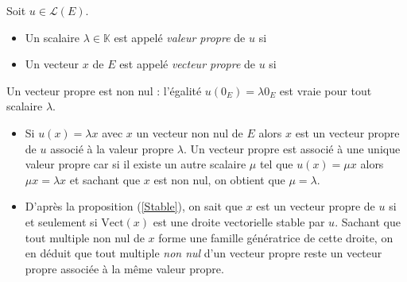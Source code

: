 \documentclass[french,11pt,twoside]{VcCours}
\begin{document}
\begin{Definition}{} Soit $u \in \mathcal{L}(E)$.

\begin{itemize}
\item Un scalaire $\lambda \in \mathbb{K}$ est appelé \emph{valeur propre} de $u$ si \newline {}
\item Un vecteur $x$ de $E$ est appelé \emph{vecteur propre} de $u$ si \newline {}
\end{itemize}
\end{Definition}


\begin{Remarque}[\alerte]{} Un vecteur propre est non nul : l'égalité $u(0_E) = \lambda 0_E$ est vraie pour tout scalaire $\lambda$.
\end{Remarque}


\begin{Remarques}{}
\begin{itemize} 
\item Si $u(x) = \lambda x$ avec $x$ un vecteur non nul de $E$ alors $x$ est un vecteur propre de $u$ associé à la valeur propre $\lambda$. Un vecteur propre est associé à une unique valeur propre car si il existe un autre scalaire $\mu$ tel que $u(x)= \mu x$ alors $\mu x = \lambda x$ et sachant que $x$ est non nul, on obtient que $\mu = \lambda$.
\item D'après la proposition (\ref{Stable}), on sait que $x$ est un vecteur propre de $u$ si et seulement si $\textrm{Vect}(x)$ est une droite vectorielle stable par $u$. Sachant que tout multiple non nul de $x$ forme une famille génératrice de cette droite, on en déduit que tout multiple \emph{non nul} d'un vecteur propre reste un vecteur propre associée à la même valeur propre.
\end{itemize}
\end{Remarques}

\end{document}
